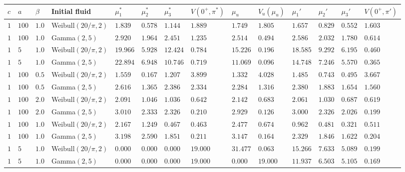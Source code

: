 \begin{landscape}
	\begin{table}[H]
		\centering
		\begin{tabularx}{\linewidth}{llllllllllllll}
			$c$& $a$ & $\beta$ & Initial fluid & $\mu_1^*$ & $\mu_2^*$ & $\mu_3^*$ & $V(0^+,\pi^*)$ & $\mu_u$ & $V_u(\mu_u)$ &$\mu_1'$ & $\mu_2'$ & $\mu_3'$ &$V(0^+,\pi')$  \\
			\hline    
			$1$ & $100$ & $1.0$ & Weibull$(20/\pi,2)$ & $1.839$ & $0.578$ & $1.144$ & $1.889$ & $1.749$ & $1.805$ & $1.657$ & $0.829$ & $0.552$ & $1.603$ \\ 
			$1$ & $100$ & $1.0$ & Gamma$(2,5)$ & $2.920$ & $1.964$ & $2.451$ & $1.235$ & $2.514$ & $0.494$ & $2.586$ & $2.032$ & $1.780$ & $0.614$ \\ 
			$1$ & $5$ & $1.0$ & Weibull$(20/\pi,2)$ & $19.966$ & $5.928$ & $12.424$ & $0.784$ & $15.226$ & $0.196$ & $18.585$ & $9.292$ & $6.195$ & $0.460$ \\ 
			$1$ & $5$ & $1.0$ & Gamma$(2,5)$ & $22.894$ & $6.948$ & $10.746$ & $0.719$ & $11.069$ & $0.096$ & $14.748$ & $7.246$ & $5.570$ & $0.365$ \\ 
			$1$ & $100$ & $0.5$ & Weibull$(20/\pi,2)$ & $1.559$ & $0.167$ & $1.207$ & $3.899$ & $1.332$ & $4.028$ & $1.485$ & $0.743$ & $0.495$ & $3.667$ \\ 
			$1$ & $100$ & $0.5$ & Gamma$(2,5)$ & $2.616$ & $1.365$ & $2.386$ & $2.334$ & $2.284$ & $1.316$ & $2.380$ & $1.883$ & $1.654$ & $1.560$ \\ 
			$1$ & $100$ & $2.0$ & Weibull$(20/\pi,2)$ & $2.091$ & $1.046$ & $1.036$ & $0.642$ & $2.142$ & $0.683$ & $2.061$ & $1.030$ & $0.687$ & $0.619$ \\ 
			$1$ & $100$ & $2.0$ & Gamma$(2,5)$ & $3.010$ & $2.333$ & $2.326$ & $0.210$ & $2.929$ & $0.126$ & $3.000$ & $2.326$ & $2.026$ & $0.199$ \\ 
			$1$ & $100$ & $1.0$ & Weibull$(20/\pi,2)$ & $2.167$ & $1.249$ & $0.467$ & $0.463$ & $2.477$ & $0.674$ & $0.962$ & $0.481$ & $0.321$ & $0.511$ \\ 
			$1$ & $100$ & $1.0$ & Gamma$(2,5)$ & $3.198$ & $2.590$ & $1.851$ & $0.211$ & $3.147$ & $0.164$ & $2.329$ & $1.846$ & $1.622$ & $0.204$ \\ 
			$1$ & $5$ & $1.0$ & Weibull$(20/\pi,2)$ & $0.000$ & $0.000$ & $0.000$ & $19.000$ & $31.477$ & $0.063$ & $15.266$ & $7.633$ & $5.089$ & $0.199$ \\ 
			$1$ & $5$ & $1.0$ & Gamma$(2,5)$ & $0.000$ & $0.000$ & $0.000$ & $19.000$ & $0.000$ & $19.000$ & $11.937$ & $6.503$ & $5.105$ & $0.169$ \\ 

\end{tabularx}
\end{table}
\end{landscape}
